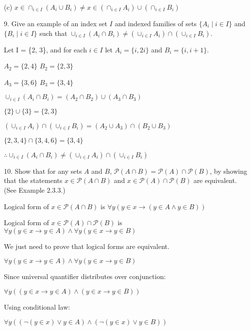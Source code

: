 \documentclass{article}
\begin{document}
(c) $x \in \cap_{i \in I} (A_i \cup B_i) \neq x \in (\cap_{i \in I} A_i) \cup (\cap_{i \in I} B_i)$

\vspace{30pt}

9. Give an example of an index set $I$ and indexed families of sets $\{A_i \mid i \in I\}$
and $\{B_i \mid i \in I\}$ such that $\cup_{i \in I} (A_i \cap B_i) \neq (\cup_{i \in I} A_i) \cap (\cup_{i \in I} B_i)$.
\vspace{30pt}

Let I = \{2, 3\}, and for each $i \in I$ let $A_i = \{i, 2i\}$ and $B_i = \{i,i + 1\}$.


$A_2 = \{2, 4\}$ $B_2 = \{2, 3\}$

$A_3 = \{3, 6\}$ $B_3 = \{3, 4\}$

$\cup_{i \in I} (A_i \cap B_i) = (A_2 \cap B_2) \cup (A_3 \cap B_3)$

$\{2\} \cup \{3\} = \{2, 3\}$

$(\cup_{i \in I} A_i) \cap (\cup_{i \in I} B_i) = (A_2 \cup A_3) \cap (B_2 \cup B_3)$

$\{2,3,4\} \cap \{3,4,6\} = \{3,4\}$

$\therefore \cup_{i \in I} (A_i \cap B_i) \neq (\cup_{i \in I} A_i) \cap (\cup_{i \in I} B_i)$

\vspace{30pt}

10. Show that for any sets $A$ and $B$, $\mathcal{P} (A \cap B) = \mathcal{P}(A) \cap \mathcal{P}(B)$, by showing
that the statements $x \in \mathcal{P} (A \cap B)$ and $x \in \mathcal{P}(A) \cap \mathcal{P}(B)$ are equivalent.
(See Example 2.3.3.)
\vspace{30pt}

Logical form of $x \in \mathcal{P} (A \cap B)$ is $\forall y (y \in x \to (y \in A \land y \in B))$

Logical form of $x \in \mathcal{P}(A) \cap \mathcal{P}(B)$ is $\forall y (y \in x \to y \in A) \land \forall y (y \in x \to y \in B)$

We just need to prove that logical forms are equivalent.

$\forall y (y \in x \to y \in A) \land \forall y (y \in x \to y \in B)$

Since universal quantifier distributes over conjunction:

$\forall y ((y \in x \to y \in A) \land (y \in x \to y \in B))$

Using conditional law:

$\forall y ((\neg (y \in x) \lor y \in A) \land (\neg (y \in x) \lor y \in B))$
\end{document}
